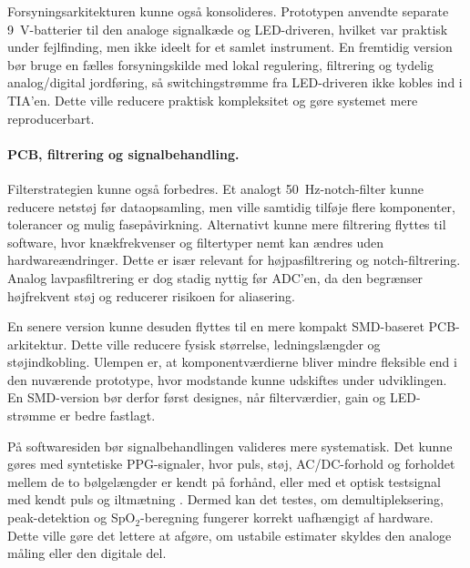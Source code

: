 Forsyningsarkitekturen kunne også konsolideres. Prototypen anvendte separate \SI{9}{V}-batterier til den analoge signalkæde og LED-driveren, hvilket var praktisk under fejlfinding, men ikke ideelt for et samlet instrument. En fremtidig version bør bruge en fælles forsyningskilde med lokal regulering, filtrering og tydelig analog/digital jordføring, så switchingstrømme fra LED-driveren ikke kobles ind i TIA'en. Dette ville reducere praktisk kompleksitet og gøre systemet mere reproducerbart.

\paragraph{\normalfont PCB, filtrering og signalbehandling.}
Filterstrategien kunne også forbedres. Et analogt \SI{50}{Hz}-notch-filter kunne reducere netstøj før dataopsamling, men ville samtidig tilføje flere komponenter, tolerancer og mulig fasepåvirkning. Alternativt kunne mere filtrering flyttes til software, hvor knækfrekvenser og filtertyper nemt kan ændres uden hardwareændringer. Dette er især relevant for højpasfiltrering og notch-filtrering. Analog lavpasfiltrering er dog stadig nyttig før ADC'en, da den begrænser højfrekvent støj og reducerer risikoen for aliasering.

En senere version kunne desuden flyttes til en mere kompakt SMD-baseret PCB-arkitektur. Dette ville reducere fysisk størrelse, ledningslængder og støjindkobling. Ulempen er, at komponentværdierne bliver mindre fleksible end i den nuværende prototype, hvor modstande kunne udskiftes under udviklingen. En SMD-version bør derfor først designes, når filterværdier, gain og LED-strømme er bedre fastlagt.

På softwaresiden bør signalbehandlingen valideres mere systematisk. Det kunne gøres med syntetiske PPG-signaler, hvor puls, støj, AC/DC-forhold og forholdet mellem de to bølgelængder er kendt på forhånd, eller med et optisk testsignal med kendt puls og iltmætning \cite[s.~112]{Webster1997}. Dermed kan det testes, om demultipleksering, peak-detektion og SpO$_2$-beregning fungerer korrekt uafhængigt af hardware. Dette ville gøre det lettere at afgøre, om ustabile estimater skyldes den analoge måling eller den digitale del.
